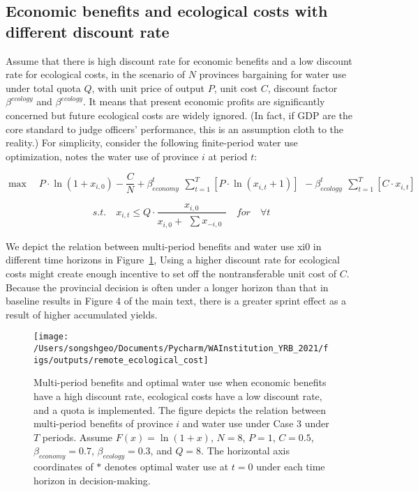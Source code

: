 \subsection*{Economic benefits and ecological costs with different discount rate}

Assume that there is high discount rate for economic benefits and a low discount rate for ecological costs, in the scenario of $N$ provinces bargaining for water use under total quota $Q$, with unit price of output $P$, unit cost $C$, discount factor $\beta^{ecology}$ and $\beta^{ecology}$.
It means that present economic profits are significantly concerned but future ecological costs are widely ignored. (In fact, if GDP are the core standard to judge officers’ performance, this is an assumption cloth to the reality.) For simplicity, consider the following finite-period water use optimization, notes the water use of province $i$ at period $t$:

\[ \max \quad P \cdot \ln(1+x_{i,0})-\frac{C}{N}+\beta_{economy}^t \begin{matrix} \sum_{t=1}^T [P \cdot \ln(x_{i,t}+1)]  \end{matrix} - \beta_{ecology}^t \begin{matrix} \sum_{t=1}^T [C \cdot x_{i,t}] \end{matrix}\]

\[s.t. \quad x_{i,t} \leq Q \cdot \frac{x_{i,0}}{x_{i,0} + \begin{matrix} \sum x_{-i,0} \end{matrix}} \quad for \quad \forall t\]

We depict the relation between multi-period benefits and water use xi0 in different time horizons in Figure~\ref{fig:remote_cost}, Using a higher discount rate for ecological costs might create enough incentive to set off the nontransferable unit cost of $C$.
Because the provincial decision is often under a longer horizon than that in baseline results in Figure 4 of the main text, there is a greater sprint effect as a result of higher accumulated yields.

\begin{figure}[h!]
	\centering
	\texttt{[image: /Users/songshgeo/Documents/Pycharm/WAInstitution\_YRB\_2021/figs/outputs/remote\_ecological\_cost]}
	\caption{Multi-period benefits and optimal water use when economic benefits have a high discount rate, ecological costs have a low discount rate, and a quota is implemented. The figure depicts the relation between multi-period benefits of province $i$ and water use under Case 3 under $T$ periods. Assume $F(x)=\ln(1+x)$, $N=8$, $P=1$, $C=0.5$, $\beta_{economy}=0.7$, $\beta_{ecology}=0.3$, and $Q=8$. The horizontal axis coordinates of $*$ denotes optimal water use at $t=0$ under each time horizon in decision-making.
	}
	\label{fig:remote_cost}
\end{figure}
